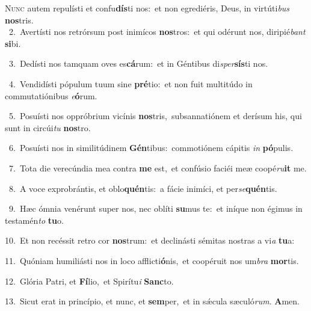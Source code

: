 \lettrine{\initial\textcolor{\initialcolor}{N}}{unc} autem repulísti et confu\-\textbf{dís}\-ti nos:~\star et non egrediéris, Deus, in virtúti\textit{bus} \textbf{nos}\-tris.\\
{\numbfont\textcolor{\numbcolor}{~2.}}~Avertísti nos retrórsum post inimícos \textbf{nos}\-tros:~\star et qui odérunt nos, diripié\textit{bant} \textbf{si}\-bi.\par
{\numbfont\textcolor{\numbcolor}{~3.}}~Dedísti nos tamquam oves es\-\textbf{cá}\-rum:~\star et in Géntibus di\-\textit{sper}\-\textbf{sís}ti nos.\par
{\numbfont\textcolor{\numbcolor}{~4.}}~Vendidísti pópulum tuum sine \textbf{pré}\-tio:~\star et non fuit multitúdo in commutatiónibus \textit{e}\-\textbf{ó}rum.\par
{\numbfont\textcolor{\numbcolor}{~5.}}~Posuísti nos oppróbrium vicínis \textbf{nos}\-tris,~\star subsannatiónem et derísum his, qui sunt in circúi\textit{tu} \textbf{nos}\-tro.\par
{\numbfont\textcolor{\numbcolor}{~6.}}~Posuísti nos in similitúdinem \textbf{Gén}\-tibus:~\star commotiónem cápitis \textit{in} \textbf{pó}\-pulis.\par
{\numbfont\textcolor{\numbcolor}{~7.}}~Tota die verecúndia mea contra \textbf{me} est,~\star et confúsio faciéi meæ coopé\-\textit{ru}\-\textbf{it} me.\par
{\numbfont\textcolor{\numbcolor}{~8.}}~A voce exprobrántis, et oblo\-\textbf{quén}\-tis:~\star a fácie inimíci, et per\-\textit{se}\-\textbf{quén}tis.\par
{\numbfont\textcolor{\numbcolor}{~9.}}~Hæc ómnia venérunt super nos, nec oblíti \textbf{su}\-mus te:~\star et iníque non égimus in testamén\textit{to} \textbf{tu}\-o.\par
{\numbfont\textcolor{\numbcolor}{10.}}~Et non recéssit retro cor \textbf{nos}\-trum:~\star et declinásti sémitas nostras a vi\textit{a} \textbf{tu}\-a:\par
{\numbfont\textcolor{\numbcolor}{11.}}~Quóniam humiliásti nos in loco afflicti\-\textbf{ó}\-nis,~\star et coopéruit nos um\textit{bra} \textbf{mor}\-tis.\par
{\numbfont\textcolor{\numbcolor}{12.}}~Glória Patri, et \textbf{Fí}\-lio,~\star et Spirítu\textit{i} \textbf{Sanc}\-to.\par
{\numbfont\textcolor{\numbcolor}{13.}}~Sicut erat in princípio, et nunc, et \textbf{sem}\-per,~\star et in sǽcula sæculó\-\textit{rum}\-. \textbf{A}\-men.\par
